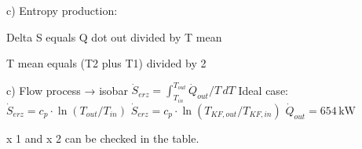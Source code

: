 c) Entropy production:  

Delta S equals Q dot out divided by T mean  

T mean equals (T2 plus T1) divided by 2

c) Flow process → isobar  
\( \dot{S}_{erz} = \int_{T_{in}}^{T_{out}} \dot{Q}_{out}/T \, dT \)  
Ideal case:  
\( \dot{S}_{erz} = c_{p} \cdot \ln(T_{out}/T_{in}) \)  
\( \dot{S}_{erz} = c_{p} \cdot \ln(T_{KF,out}/T_{KF,in}) \)  
\( \dot{Q}_{out} = 654 \, \text{kW} \)

x 1 and x 2 can be checked in the table.